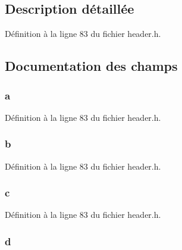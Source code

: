 \subsection{Description détaillée}


Définition à la ligne 83 du fichier header.\+h.



\subsection{Documentation des champs}
\hypertarget{structt__skill__list_a39a494bb9ce01ba13ea4577fe2b1cc79}{
\subsubsection[{a}]{ a}}\label{structt__skill__list_a39a494bb9ce01ba13ea4577fe2b1cc79}


Définition à la ligne 83 du fichier header.\+h.

\hypertarget{structt__skill__list_a85ae40dbaecefd131b936ec65e9f4809}{
\subsubsection[{b}]{ b}}\label{structt__skill__list_a85ae40dbaecefd131b936ec65e9f4809}


Définition à la ligne 83 du fichier header.\+h.

\hypertarget{structt__skill__list_ac9055dd2d5c45c223e3b0e1920c31493}{
\subsubsection[{c}]{ c}}\label{structt__skill__list_ac9055dd2d5c45c223e3b0e1920c31493}


Définition à la ligne 83 du fichier header.\+h.

\hypertarget{structt__skill__list_a0bb2c4a26ff65aecd7a36ad7ee898cd8}{
\subsubsection[{d}]{ d}}\label{structt__skill__list_a0bb2c4a26ff65aecd7a36ad7ee898cd8}


